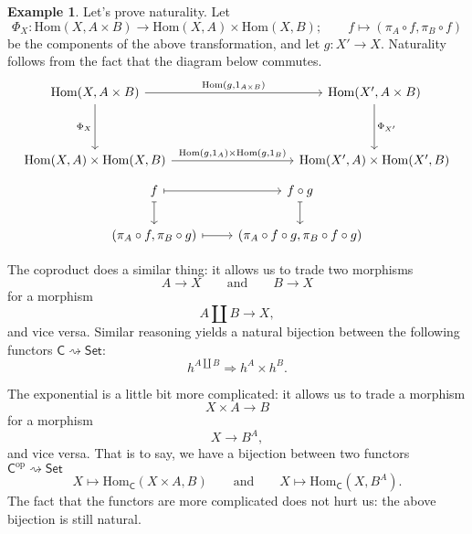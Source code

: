 \documentclass[a4paper,10pt]{scrreprt}
\newcommand{\Hom}{\mathrm{Hom}}
\theoremstyle{definition}
\newtheorem{example}{Example}[section]
\theoremstyle{plain}
\theoremstyle{remark}
\begin{document}
\begin{example}
  Let's prove naturality. Let
  \begin{equation*}
    \Phi_{X}\colon \Hom(X, A \times B) \to \Hom(X, A) \times \Hom(X, B);\qquad f \mapsto (\pi_{A} \circ f, \pi_{B} \circ f)
  \end{equation*}
  be the components of the above transformation, and let $g\colon X' \to X$. Naturality follows from the fact that the diagram below commutes.
  \begin{equation*}
    \begin{tikzcd}[row sep=huge, column sep=huge]
      \Hom(X, A \times B)
      \arrow[rr, "{\Hom(g, 1_{A \times B})}"]
      \arrow[d, swap, "\Phi_{X}"]
      & & \Hom(X', A \times B)
      \arrow[d, "\Phi_{X'}"]
      \\
      \Hom(X, A) \times \Hom(X, B)
      \arrow[rr, "{\Hom(g, 1_{A}) \times \Hom(g, 1_{B})}"]
      & & \Hom(X', A) \times \Hom(X', B)
    \end{tikzcd}
  \end{equation*}
  \begin{equation*}
    \begin{tikzcd}
      f
      \arrow[r, mapsto]
      \arrow[d, mapsto]
      & f \circ g
      \arrow[d, mapsto]
      \\
      (\pi_{A} \circ f, \pi_{B} \circ g)
      \arrow[r, mapsto]
      & (\pi_{A} \circ f \circ g, \pi_{B} \circ f \circ g)
    \end{tikzcd}
  \end{equation*}

  The coproduct does a similar thing: it allows us to trade two morphisms
  \begin{equation*}
    A \to X\qquad\text{and}\qquad B \to X
  \end{equation*}
  for a morphism
  \begin{equation*}
    A \amalg B \to X,
  \end{equation*}
  and vice versa. Similar reasoning yields a natural bijection between the following functors $\mathsf{C} \rightsquigarrow \mathsf{Set}$:
  \begin{equation*}
    h^{A \amalg B} \Rightarrow h^{A} \times h^{B}.
  \end{equation*}

  The exponential is a little bit more complicated: it allows us to trade a morphism
  \begin{equation*}
    X \times A \to B
  \end{equation*}
  for a morphism 
  \begin{equation*}
    X \to B^{A},
  \end{equation*}
  and vice versa.  That is to say, we have a bijection between two functors $\mathsf{C}^{\mathrm{op}} \rightsquigarrow \mathsf{Set}$
  \begin{equation*}
    X \mapsto \Hom_{\mathsf{C}}(X \times A, B)\qquad\text{and}\qquad X \mapsto \Hom_{\mathsf{C}}(X, B^{A}).
  \end{equation*}
  The fact that the functors are more complicated does not hurt us: the above bijection is still natural.
\end{example}
\end{document}
